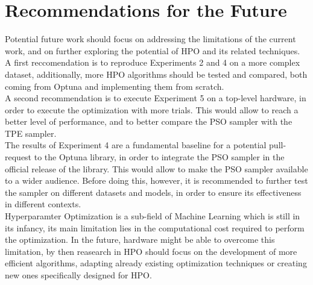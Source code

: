 \section{Recommendations for the Future}

Potential future work should focus on addressing the limitations of the current work, and on further exploring the potential of HPO and its related techniques.
\\[0.3cm]A first reccomendation is to reproduce Experiments 2 and 4 on a more complex dataset, additionally, more HPO algorithms should be tested and compared, both coming from Optuna and implementing them from scratch.
\\[0.3cm]A second recommendation is to execute Experiment 5 on a top-level hardware, in order to execute the optimization with more trials. This would allow to reach a better level of performance, and to better compare the PSO sampler with the TPE sampler.
\\[0.3cm]The results of Experiment 4 are a fundamental baseline for a potential pull-request to the Optuna library, in order to integrate the PSO sampler in the official release of the library. This would allow to make the PSO sampler available to a wider audience. Before doing this, however, it is recommended to further test the sampler on different datasets and models, in order to ensure its effectiveness in different contexts.
\\[0.3cm]Hyperparamter Optimization is a sub-field of Machine Learning which is still in its infancy, its main limitation lies in the computational cost required to perform the optimization. In the future, hardware might be able to overcome this limitation, by then reasearch in HPO should focus on the development of more efficient algorithms, adapting already existing optimization techniques or creating new ones specifically designed for HPO.   